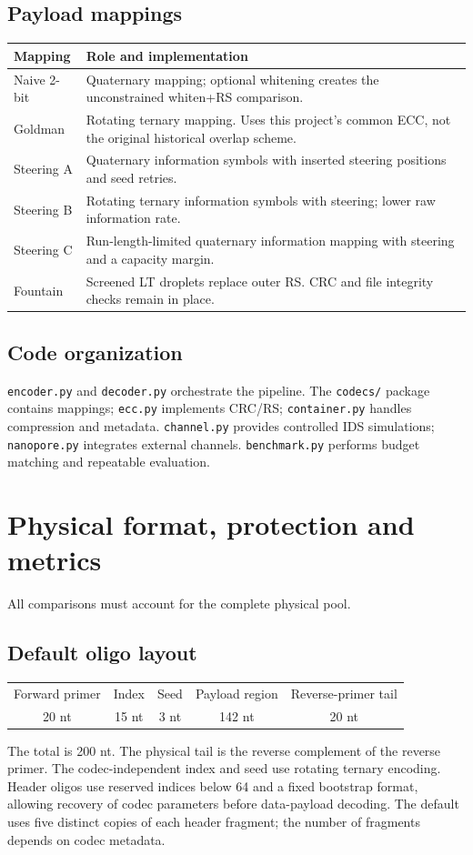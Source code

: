 \documentclass[11pt,a4paper]{article}
\newcommand{\pageheading}[2]{\clearpage\section{#1}{\color{muted}\small #2}\par\vspace{5pt}}
\begin{document}
\subsection*{Payload mappings}
{\small\begin{tabularx}{\linewidth}{p{31mm}Y}
\toprule Mapping & Role and implementation\\\midrule
Naive 2-bit & Quaternary mapping; optional whitening creates the unconstrained whiten+RS comparison.\\
Goldman & Rotating ternary mapping. Uses this project's common ECC, not the original historical overlap scheme.\\
Steering A & Quaternary information symbols with inserted steering positions and seed retries.\\
Steering B & Rotating ternary information symbols with steering; lower raw information rate.\\
Steering C & Run-length-limited quaternary information mapping with steering and a capacity margin.\\
Fountain & Screened LT droplets replace outer RS. CRC and file integrity checks remain in place.\\
\bottomrule\end{tabularx}}

\subsection*{Code organization}
\texttt{encoder.py} and \texttt{decoder.py} orchestrate the pipeline. The
\texttt{codecs/} package contains mappings; \texttt{ecc.py} implements CRC/RS;
\texttt{container.py} handles compression and metadata. \texttt{channel.py} provides
controlled IDS simulations; \texttt{nanopore.py} integrates external channels.
\texttt{benchmark.py} performs budget matching and repeatable evaluation.

\pageheading{Physical format, protection and metrics}{All comparisons must account for the complete physical pool.}
\subsection*{Default oligo layout}
\begin{center}
\begin{tabular}{ccccc}
\toprule Forward primer & Index & Seed & Payload region & Reverse-primer tail\\
20 nt & 15 nt & 3 nt & 142 nt & 20 nt\\\bottomrule
\end{tabular}
\end{center}
The total is 200 nt. The physical tail is the reverse complement of the reverse primer.
The codec-independent index and seed use rotating ternary encoding. Header oligos use
reserved indices below 64 and a fixed bootstrap format, allowing recovery of codec
parameters before data-payload decoding. The default uses five distinct copies of each
header fragment; the number of fragments depends on codec metadata.
\end{document}
